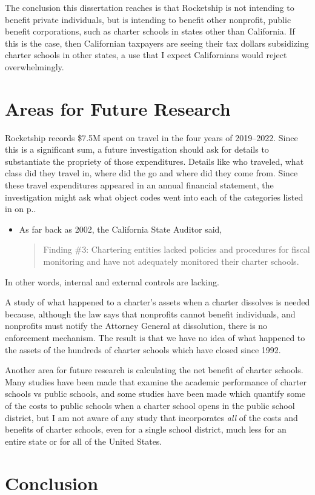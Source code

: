 The conclusion this dissertation reaches is that Rocketship is not intending to benefit private individuals, but is intending to benefit other nonprofit, public benefit corporations, such as charter schools in states other than California. If this is the case, then Californian taxpayers are seeing their tax dollars subsidizing charter schools in other states, a use that I expect Californians would reject overwhelmingly.

\section{Areas for Future Research}%
\label{sec:areas-future-rese}\indent%

Rocketship records \$7.5M spent on travel in the four years of 2019–2022. Since this is a significant sum, a future investigation should ask for details to substantiate the propriety of those expenditures. Details like who traveled, what class did they travel in, where did the go and where did they come from. Since these travel expenditures appeared in an annual financial statement, the investigation might ask what object codes went into each of the categories listed in  on p.\pageref{tab:consolidated_functional_expenses}.

\begin{itemize}[topsep=0.125\baselineskip,itemsep=0.25\baselineskip]
  \item As far back as 2002, the California State Auditor said, 
  \begin{quote}
    Finding \#3: Chartering entities lacked policies and procedures for fiscal monitoring and have not adequately monitored their charter schools. 
  \end{quote}
\end{itemize}
In other words, internal and external controls are lacking.

A study of what happened to a charter's assets when a charter dissolves is needed because, although the law says that nonprofits cannot benefit individuals, and nonprofits must notify the Attorney General at dissolution, there is no enforcement mechanism. The result is that we have no idea of what happened to the assets of the hundreds of charter schools which have closed since 1992.

Another area for future research is calculating the net benefit of charter schools. Many studies have been made that examine the academic performance of charter schools vs public schools, and some studies have been made which quantify some of the costs to public schools when a charter school opens in the public school district, but I am not aware of any study that incorporates \textit{all} of the costs and benefits of charter schools, even for a single school district, much less for an entire state or for all of the United States.

\section{Conclusion}%
\label{sec:conclusion}\indent%


